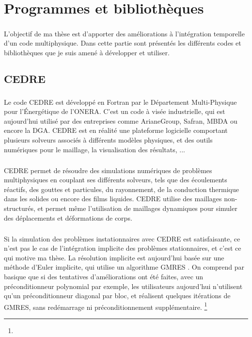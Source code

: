 \chapter{Programmes et bibliothèques}

\paragraph{}
L'objectif de ma thèse est d'apporter des améliorations à l'intégration temporelle d'un code multiphysique.
Dans cette partie sont présentés les différents codes et bibliothèques que je suis amené à développer et utiliser.

\section{CEDRE}

  \paragraph{}
  Le code CEDRE est développé en Fortran par le Département Multi-Physique pour l'Énergétique de l'ONERA.
  C'est un code à visée industrielle, qui est aujourd'hui utilisé par des entreprises comme ArianeGroup, Safran, MBDA ou encore la DGA.
  CEDRE est en réalité une plateforme logicielle comportant plusieurs solveurs associés à différents modèles physiques, et des outils numériques pour le maillage, la visualisation des résultats, ...

  \paragraph{}
  CEDRE permet de résoudre des simulations numériques de problèmes multiphysiques en couplant ses différents solveurs, tels que des écoulements réactifs, des gouttes et particules, du rayonnement, de la conduction thermique dans les solides ou encore des films liquides.
  CEDRE utilise des maillages non-structurés, et permet même l'utilisation de maillages dynamiques pour simuler des déplacements et déformations de corps.

  \paragraph{}
  Si la simulation des problèmes instationnaires avec CEDRE est satisfaisante, ce n'est pas le cas de l'intégration implicite des problèmes stationnaires, et c'est ce qui motive ma thèse.
  La résolution implicite est aujourd'hui basée sur une méthode d'Euler implicite, qui utilise un algorithme GMRES 
   \cite{Selva1998}.
  On comprend par basique que si des tentatives d'améliorations ont été faites, avec un préconditionneur polynomial par exemple, les utilisateurs aujourd'hui n'utilisent qu'un préconditionneur diagonal par bloc, et réalisent quelques itérations de GMRES, sans redémarrage ni préconditionnement supplémentaire.
  \footnote{}

